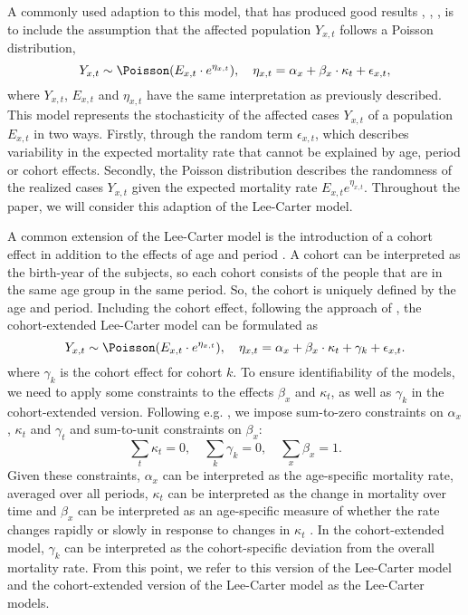 \newpar A commonly used adaption to this model, that has produced good results \parencite{CZADO2005260}, \parencite{Wisniowski2015}, \parencite{BROUHNS2002373}, is to include the assumption that the affected population $Y_{x,t}$ follows a Poisson distribution,
\begin{equation}
Y_{x,t} \sim \Poisson(E_{x,t}\cdot e^{\eta_{x,t}}), \quad \eta_{x,t}= \alpha_x + \beta_x\cdot\kappa_t + \epsilon_{x,t},
\label{eq:LC-model}
\end{equation}
where $Y_{x,t}$, $E_{x,t}$ and $\eta_{x,t}$ have the same interpretation as previously described. This model represents the stochasticity of the affected cases $Y_{x,t}$ of a population $E_{x,t}$ in two ways. Firstly, through the random term $\epsilon_{x,t}$, which describes variability in the expected mortality rate that cannot be explained by age, period or cohort effects. Secondly, the Poisson distribution describes the randomness of the realized cases $Y_{x,t}$ given the expected mortality rate $E_{x,t}e^{\eta_{x,t}}$. Throughout the paper, we will consider this adaption of the Lee-Carter model. 

\newpar A common extension of the Lee-Carter model is the introduction of a cohort effect in addition to the effects of age and period \parencite{Wisniowski2015}. A cohort can be interpreted as the birth-year of the subjects, so each cohort consists of the people that are in the same age group in the same period. So, the cohort is uniquely defined by the age and period. Including the cohort effect, following the approach of \textcite{Wisniowski2015}, the cohort-extended Lee-Carter model can be formulated as
\begin{equation}
    Y_{x,t} \sim \Poisson(E_{x,t}\cdot e^{\eta_{x,t}}), \quad \eta_{x,t} = \alpha_x + \beta_x \cdot \kappa_t + \gamma_k + \epsilon_{x,t}.
    \label{eq:LCC-model-orig}
\end{equation}
where $\gamma_k$ is the cohort effect for cohort $k$. 
To ensure identifiability of the models, we need to apply some constraints to the effects $\beta_x$ and $\kappa_t$, as well as $\gamma_k$ in the cohort-extended version. Following e.g. \textcite{LeeCarter1992}, we impose sum-to-zero constraints on $\alpha_x$, $\kappa_t$ and $\gamma_t$ and sum-to-unit constraints on $\beta_x$:
\begin{equation}
    \sum_t\kappa_t = 0,\quad \sum_k\gamma_k = 0, \quad \sum_x\beta_x = 1.
    \label{eq:LC-constraints}    
\end{equation}
Given these constraints, $\alpha_x$ can be interpreted as the age-specific mortality rate, averaged over all periods, $\kappa_t$ can be interpreted as the change in mortality over time and $\beta_x$ can be interpreted as an age-specific measure of whether the rate changes rapidly or slowly in response to changes in $\kappa_t$ \parencite{LeeCarter1992}. In the cohort-extended model, $\gamma_k$ can be interpreted as the cohort-specific deviation from the overall mortality rate. From this point, we refer to this version of the Lee-Carter model and the cohort-extended version of the Lee-Carter model as the Lee-Carter models. 

